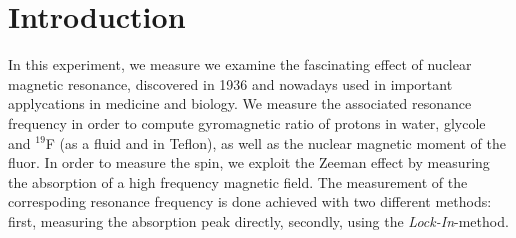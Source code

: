 \section{Introduction}

In this experiment, we measure we examine the fascinating effect of nuclear 
magnetic resonance, discovered in 1936 and nowadays used in important applycations 
in medicine and biology. 
We measure the associated resonance frequency in order to compute 
gyromagnetic ratio of protons in water, glycole and $^19$F
(as a fluid and in Teflon), as well as the nuclear magnetic moment of the fluor. 
In order to measure the spin, we exploit the Zeeman effect
by measuring the absorption of a high frequency magnetic field. 
The measurement of the correspoding resonance frequency is done achieved 
with two different methods: first, measuring the absorption peak directly, 
secondly, using the \emph{Lock-In}-method. 

